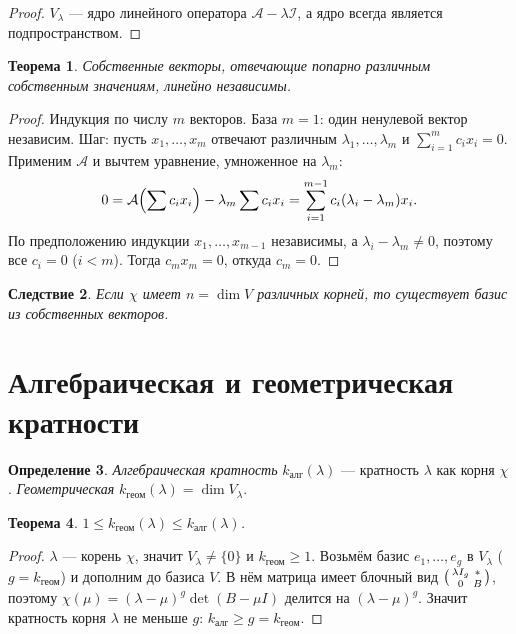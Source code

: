\documentclass[11pt,a4paper]{article}
\theoremstyle{definition}
\newtheorem{definition}{Определение}[section]
\theoremstyle{plain}
\newtheorem{theorem}[definition]{Теорема}
\newtheorem{corollary}[definition]{Следствие}
\renewcommand{\le}{\leqslant}
\renewcommand{\ge}{\geqslant}
\begin{document}
\begin{proof}
$V_\lambda$ — ядро линейного оператора $\mathcal A-\lambda\mathcal I$, а ядро всегда является
подпространством.
\end{proof}

\begin{theorem}
Собственные векторы, отвечающие \emph{попарно различным} собственным значениям, линейно независимы.
\end{theorem}

\begin{proof}
Индукция по числу $m$ векторов. База $m=1$: один ненулевой вектор независим. Шаг: пусть
$x_1,\dots,x_m$ отвечают различным $\lambda_1,\dots,\lambda_m$ и
$\sum_{i=1}^m c_i x_i=0$. Применим $\mathcal A$ и вычтем уравнение, умноженное на $\lambda_m$:
\[
  0=\mathcal A\Bigl(\sum c_i x_i\Bigr)-\lambda_m\sum c_i x_i=\sum_{i=1}^{m-1}c_i(\lambda_i-\lambda_m)x_i .
\]
По предположению индукции $x_1,\dots,x_{m-1}$ независимы, а $\lambda_i-\lambda_m\ne0$, поэтому все
$c_i=0$ ($i<m$). Тогда $c_m x_m=0$, откуда $c_m=0$.
\end{proof}

\begin{corollary}
Если $\chi$ имеет $n=\dim V$ различных корней, то существует базис из собственных векторов.
\end{corollary}

\section{Алгебраическая и геометрическая кратности}

\begin{definition}
\emph{Алгебраическая кратность} $k_{\text{алг}}(\lambda)$ — кратность $\lambda$ как корня $\chi$.
\emph{Геометрическая} $k_{\text{геом}}(\lambda)=\dim V_\lambda$.
\end{definition}

\begin{theorem}
$1\le k_{\text{геом}}(\lambda)\le k_{\text{алг}}(\lambda)$.
\end{theorem}

\begin{proof}
$\lambda$ — корень $\chi$, значит $V_\lambda\ne\{0\}$ и $k_{\text{геом}}\ge1$. Возьмём базис
$e_1,\dots,e_g$ в $V_\lambda$ ($g=k_{\text{геом}}$) и дополним до базиса $V$. В нём матрица имеет
блочный вид $\begin{psmallmatrix}\lambda I_g & *\\ 0 & B\end{psmallmatrix}$, поэтому
$\chi(\mu)=(\lambda-\mu)^g\det(B-\mu I)$ делится на $(\lambda-\mu)^g$. Значит кратность корня
$\lambda$ не меньше $g$: $k_{\text{алг}}\ge g=k_{\text{геом}}$.
\end{proof}
\end{document}
